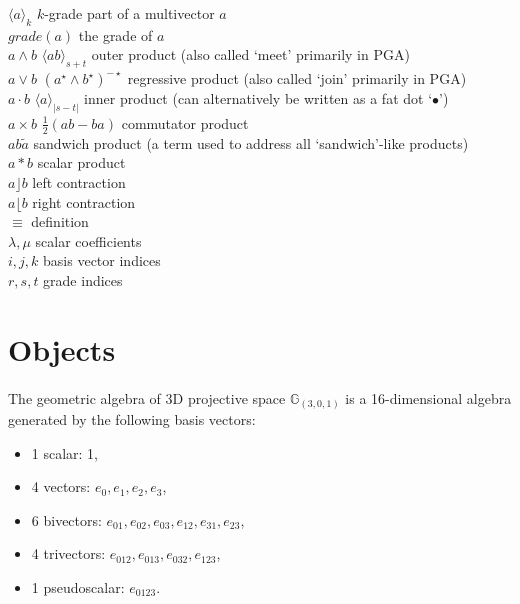 \documentclass{article}
\begin{document}
\begin{tabbing}
    $\langle a \rangle_{k}$ \> \> $k$-grade part of a multivector $a$\\
    $grade(a)$ \> \> the grade of $a$\\
    $a \wedge b$ \> $\langle ab \rangle_{ s+t }$ \> outer product (also called `meet' primarily in PGA)\\
    $a \vee b$ \> $(a^{\star} \wedge b^{\star})^{-\star}$ \> regressive product (also called `join' primarily in PGA)\\
    $a \cdot b$ \> $\langle a \rangle_{\vert s-t \vert}$ \> inner product (can alternatively be written as a fat dot `$\bullet$')\\
    $a \times b$ \> $\frac{1}{2}(ab - ba)$ \> commutator product\\
    $ab\tilde{a}$ \> \> sandwich product (a term used to address all `sandwich'-like products)\\
    $a * b$ \> \> scalar product\\
    $a \rfloor b$ \> \> left contraction\\
    $a \lfloor b$ \> \> right contraction\\
    $\equiv$ \> \> definition\\
    $\lambda, \mu$ \> \> scalar coefficients\\
    $i, j, k$ \> \> basis vector indices\\
    $r, s, t$ \> \> grade indices\\
\end{tabbing}


\section{Objects}

\paragraph{}The geometric algebra of 3D projective space $\mathbb{G}_{(3,0,1)}$ is a 16-dimensional algebra generated by the following basis vectors:

\begin{itemize}
\item 1 scalar: 1,
\item 4 vectors: $e_0, e_1, e_2, e_3$,
\item 6 bivectors: $e_{01}, e_{02}, e_{03}, e_{12}, e_{31}, e_{23}$,
\item 4 trivectors: $e_{012}, e_{013}, e_{032}, e_{123}$,
\item 1 pseudoscalar: $e_{0123}$.
\end{itemize}
\end{document}

